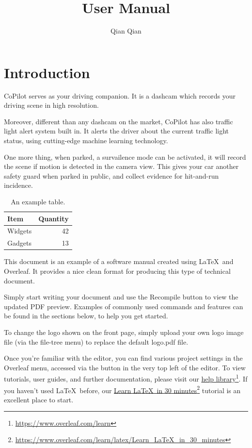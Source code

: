 \documentclass[a4paper]{manual}
\title{User Manual}
\author{Qian Qian}
\newcommand{\doclink}[2]{\href{#1}{#2}\footnote{\url{#1}}}
\begin{document}
\maketitle

\tableofcontents
\listoflistings
\newpage

\section{Introduction}
CoPilot serves as your driving companion. It is a dashcam which records your driving scene in high resolution. 

Moreover, different than any dashcam on the market, CoPilot has also traffic light alert system built in. It alerts the driver about the current traffic light status, using cutting-edge machine learning technology. 

One more thing, when parked, a survailence mode can be activated, it will record the scene if motion is detected in the camera view. This gives your car another safety guard when parked in public, and collect evidence for hit-and-run incidence.


\begin{table}
\centering
\begin{tabular}{l|r}
Item & Quantity \\\hline
Widgets & 42 \\
Gadgets & 13
\end{tabular}
\caption{\label{tab:widgets}An example table.}
\end{table}


This document is an example of a software manual created using \LaTeX\ and Overleaf. It provides a nice clean format for producing this type of technical document. 

Simply start writing your document and use the Recompile button to view the updated PDF preview. Examples of commonly used commands and features can be found in the sections below, to help you get started.

To change the logo shown on the front page, simply upload your own logo image file (via the file-tree menu) to replace the default logo.pdf file. 

Once you're familiar with the editor, you can find various project settings in the Overleaf menu, accessed via the button in the very top left of the editor. To view tutorials, user guides, and further documentation, please visit our \doclink{https://www.overleaf.com/learn}{help library}. If you haven't used \LaTeX\ before, our \doclink{https://www.overleaf.com/learn/latex/Learn_LaTeX_in_30_minutes}{Learn \LaTeX\ in 30 minutes} tutorial is an excellent place to start.
\end{document}
